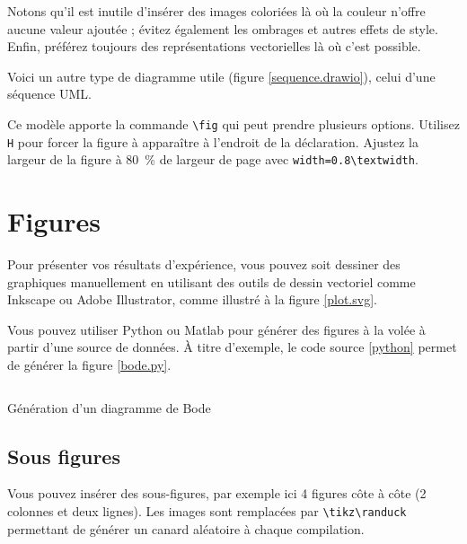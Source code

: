
Notons qu'il est inutile d'insérer des images coloriées là où la couleur n'offre aucune valeur ajoutée ; évitez également les ombrages et autres effets de style. Enfin, préférez toujours des représentations vectorielles là où c'est possible.

Voici un autre type de diagramme utile (figure \ref{sequence.drawio}), celui d'une séquence UML.


Ce modèle apporte la commande \verb!\fig! qui peut prendre plusieurs options. Utilisez \verb!H! pour forcer la figure à apparaître à l'endroit de la déclaration. Ajustez la largeur de la figure à \SI{80}{\percent} de largeur de page avec \verb!width=0.8\textwidth!.

\section{Figures}

Pour présenter vos résultats d'expérience, vous pouvez soit dessiner des graphiques manuellement en utilisant des outils de dessin vectoriel comme Inkscape ou Adobe Illustrator, comme illustré à la figure \ref{plot.svg}.


Vous pouvez utiliser Python ou Matlab pour générer des figures à la volée à partir d'une source de données. À titre d'exemple, le code source \ref{python} permet de générer la figure \ref{bode.py}.
\begin{listing}[ht]
    \inputminted{python}{assets/figures/bode.py}
    \caption{Génération d'un diagramme de Bode \label{python}}
\end{listing}


\subsection{Sous figures}

Vous pouvez insérer des sous-figures, par exemple ici 4 figures côte à côte (2 colonnes et deux lignes). Les images sont remplacées par \verb!\tikz\randuck! permettant de générer un canard aléatoire à chaque compilation.

